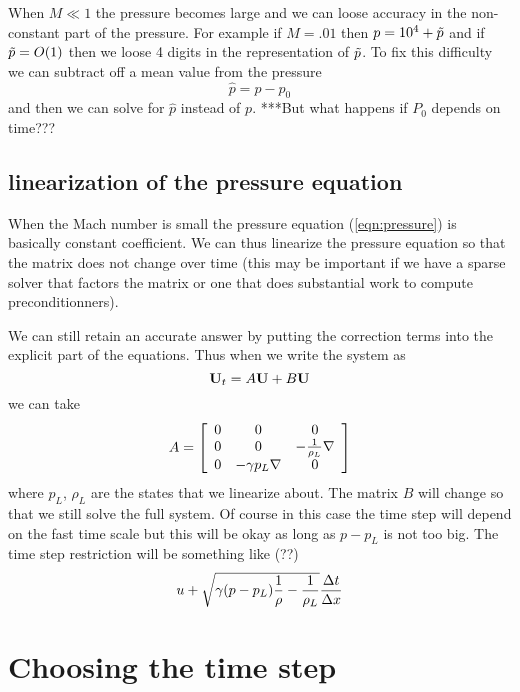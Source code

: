 \documentclass{article}
\begin{document}
When $M\ll 1$ the pressure becomes large and we can loose accuracy in the non-constant part of
the pressure. For example if $M=.01$ then $p=10^4+\tilde{p}$ and if $\tilde{p}=O(1)$ then we loose 4 digits
in the representation of $\tilde{p}$.
To fix this difficulty we can subtract off a mean value from the pressure
\[
    \hat{p} = p - p_0
\]
and then we can solve for $\hat{p}$ instead of $p$. ***But what happens if $P_0$ depends on time???


\subsection{linearization of the pressure equation}

When the Mach number is small the pressure equation (\ref{eqn:pressure}) is basically constant coefficient.
We can thus linearize the pressure equation so that the matrix does not change over time (this may
be important if we have a sparse solver that factors the matrix or one that does substantial work
to compute preconditionners). 

We can still retain an accurate answer by putting the correction terms into the explicit
part of the equations. Thus when we write the system as
\[
   {\bf U}_t = A {\bf U} + B {\bf U} 
\]
we can take 
\[
  A = \left[ \begin{array}{ccc}
                0 & 0 & 0 \\
                0 & 0 & -{1\over\rho_L}  \nabla  \\
                0 &  -\gamma p_L  \nabla  & 0 
             \end{array} \right]
\]
where $p_L$, $\rho_L$ are the states that we linearize about. The matrix $B$ will change so that
we still solve the full system. Of course in this case the time step will depend on the fast time scale
but this will be okay as long as $p-p_L$ is not too big. The time step restriction will be something like (??)
$$
      u + \sqrt{ \gamma {(p-p_L){{1\over\rho}- {1\over\rho_L}} } } {\Delta t \over \Delta x}
$$

\section{Choosing the time step}
\end{document}
